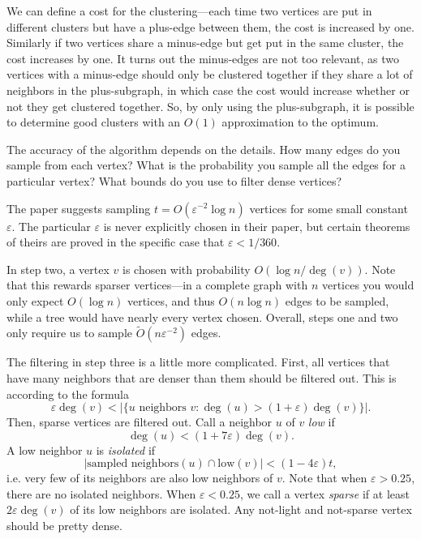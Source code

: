 \documentclass[
]{article}
\begin{document}
We can define a cost for the clustering---each time two vertices are
put in different clusters but have a plus-edge between them, the cost is
increased by one. Similarly if two vertices share a minus-edge but get
put in the same cluster, the cost increases by one. It turns out the
minus-edges are not too relevant, as two vertices with a minus-edge
should only be clustered together if they share a lot of neighbors in
the plus-subgraph, in which case the cost would increase whether or not
they get clustered together. So, by only using the plus-subgraph, it is
possible to determine good clusters with an {\(O(1)\)} approximation to
the optimum.

The accuracy of the algorithm depends on the details. How many edges do
you sample from each vertex? What is the probability you sample all the
edges for a particular vertex? What bounds do you use to filter dense
vertices?

The paper suggests sampling {\(t = O(\varepsilon^{- 2}\log n)\)}
vertices for some small constant {\(\varepsilon\)}. The particular
  {\(\varepsilon\)} is
never explicitly chosen in their paper, but certain theorems of theirs
are proved in the specific case that {\(\varepsilon < 1/360\)}.

In step two, a vertex {\(v\)} is chosen with probability
  {\(O(\log n/\deg(v))\)}. Note that this rewards sparser vertices---in a
complete graph with {\(n\)} vertices you would only expect
  {\(O(\log n)\)} vertices, and thus {\(O(n\log n)\)} edges to be sampled,
while a tree would have nearly every vertex chosen. Overall, steps one
and two only require us to sample
  {\(\tilde{O}(n\varepsilon^{- 2})\)} edges.

The filtering in step three is a little more complicated. First, all
vertices that have many neighbors that are denser than them should be filtered out. This is
according to the formula
  {\[\varepsilon\deg(v) < |\{ u\text{~neighbors~}v:\deg(u) > (1 + \varepsilon)\deg(v)\}|.\]}Then, sparse vertices are filtered out.
Call a neighbor $u$ of $v$ \emph{low} if
  {\[\deg(u) < (1 + 7\varepsilon)\deg(v).\]}A low neighbor {\(u\)} is
\emph{isolated} if
  {\[|\text{sampled\ neighbors}(u) \cap \text{low}(v)| < (1 - 4\varepsilon)t,\]}i.e.
very few of its neighbors are also low neighbors of {\(v\)}. Note that when $\varepsilon > 0.25$, there are no isolated neighbors. When $\varepsilon < 0.25$, we call a vertex \emph{sparse} if at least {\(2\varepsilon\deg(v)\)} of its low neighbors are isolated. Any not-light and not-sparse vertex should be pretty dense.
\end{document}
